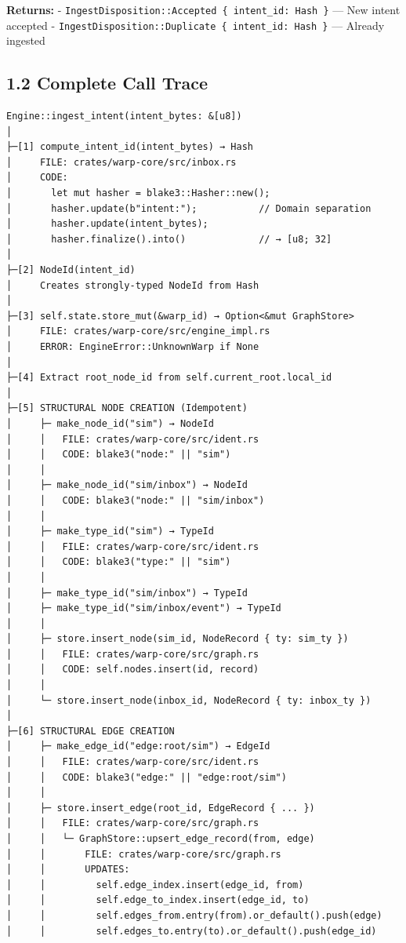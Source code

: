 \documentclass[11pt]{book}
\begin{document}
\textbf{Returns:} -
\texttt{IngestDisposition::Accepted\ \{\ intent\_id:\ Hash\ \}} --- New
intent accepted -
\texttt{IngestDisposition::Duplicate\ \{\ intent\_id:\ Hash\ \}} ---
Already ingested

\subsection{1.2 Complete Call Trace}\label{complete-call-trace}

\begin{verbatim}
Engine::ingest_intent(intent_bytes: &[u8])
│
├─[1] compute_intent_id(intent_bytes) → Hash
│     FILE: crates/warp-core/src/inbox.rs
│     CODE:
│       let mut hasher = blake3::Hasher::new();
│       hasher.update(b"intent:");           // Domain separation
│       hasher.update(intent_bytes);
│       hasher.finalize().into()             // → [u8; 32]
│
├─[2] NodeId(intent_id)
│     Creates strongly-typed NodeId from Hash
│
├─[3] self.state.store_mut(&warp_id) → Option<&mut GraphStore>
│     FILE: crates/warp-core/src/engine_impl.rs
│     ERROR: EngineError::UnknownWarp if None
│
├─[4] Extract root_node_id from self.current_root.local_id
│
├─[5] STRUCTURAL NODE CREATION (Idempotent)
│     ├─ make_node_id("sim") → NodeId
│     │   FILE: crates/warp-core/src/ident.rs
│     │   CODE: blake3("node:" || "sim")
│     │
│     ├─ make_node_id("sim/inbox") → NodeId
│     │   CODE: blake3("node:" || "sim/inbox")
│     │
│     ├─ make_type_id("sim") → TypeId
│     │   FILE: crates/warp-core/src/ident.rs
│     │   CODE: blake3("type:" || "sim")
│     │
│     ├─ make_type_id("sim/inbox") → TypeId
│     ├─ make_type_id("sim/inbox/event") → TypeId
│     │
│     ├─ store.insert_node(sim_id, NodeRecord { ty: sim_ty })
│     │   FILE: crates/warp-core/src/graph.rs
│     │   CODE: self.nodes.insert(id, record)
│     │
│     └─ store.insert_node(inbox_id, NodeRecord { ty: inbox_ty })
│
├─[6] STRUCTURAL EDGE CREATION
│     ├─ make_edge_id("edge:root/sim") → EdgeId
│     │   FILE: crates/warp-core/src/ident.rs
│     │   CODE: blake3("edge:" || "edge:root/sim")
│     │
│     ├─ store.insert_edge(root_id, EdgeRecord { ... })
│     │   FILE: crates/warp-core/src/graph.rs
│     │   └─ GraphStore::upsert_edge_record(from, edge)
│     │       FILE: crates/warp-core/src/graph.rs
│     │       UPDATES:
│     │         self.edge_index.insert(edge_id, from)
│     │         self.edge_to_index.insert(edge_id, to)
│     │         self.edges_from.entry(from).or_default().push(edge)
│     │         self.edges_to.entry(to).or_default().push(edge_id)

\end{verbatim}
\end{document}
